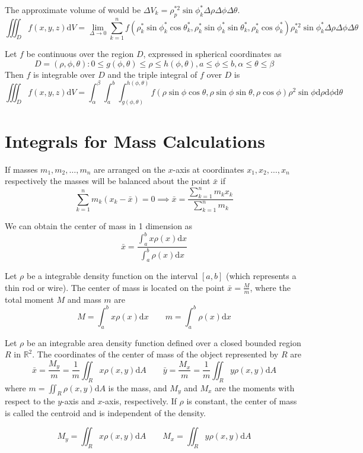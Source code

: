 \documentclass[../calc3.tex]{subfiles}
\begin{document}
The approximate volume of would be $\Delta V_k=\rho_p^{*2}\sin\phi_k^* \Delta\rho\Delta\phi\Delta\theta$.
\[\iiint_D f(x,y,z)\mathrm{d}V = \lim_{\Delta\to 0}\sum^n_{k=1}f(\rho_k^*\sin\phi_k^*\cos\theta_k^*,\rho_k^*\sin\phi_k^*\sin\theta_k^*,\rho_k^*\cos\phi_k^*)\rho_k^{*2}\sin\phi_k^*\Delta\rho\Delta\phi\Delta\theta\]

\begin{theorem}
    Let $f$ be continuous over the region $D$, expressed in spherical coordinates as 
    \[D={(\rho,\phi,\theta):0\leq g(\phi,\theta)\leq \rho\leq h(\phi,\theta),a\leq\phi\leq b,\alpha\leq \theta\leq \beta}\]
    Then $f$ is integrable over $D$ and the triple integral of $f$ over $D$ is
    \[\iiint_D f(x,y,z)\mathrm{d}V = \int_{\alpha}^{\beta}\int_a^b\int_{g(\phi,\theta)}^{h(\phi,\theta)}f(\rho\sin\phi\cos\theta,\rho\sin\phi\sin\theta,\rho\cos\phi)\rho^2\sin\phi\mathrm{d}\rho\mathrm{d}\phi\mathrm{d}\theta\]
\end{theorem}

\section{Integrals for Mass Calculations}
If masses $m_1,m_2,\dots,m_n$ are arranged on the $x$-axis at coordinates $x_1,x_2,\dots,x_n$
respectively the masses will be balanced about the point $\bar{x}$ if 
\[\sum_{k=1}^n m_k(x_k-\bar{x})=0\implies \bar{x}=\frac{\sum^n_{k=1}m_k x_k}{\sum^n_{k=1}m_k}\]

We can obtain the center of mass in 1 dimension as 
\[\bar{x}=\frac{\int_a^b x\rho(x)\mathrm{d}x}{\int_a^b\rho(x)\mathrm{d}x}\]
\pagebreak
\begin{definition}
    Let $\rho$ be a integrable density function on the interval $[a,b]$ (which represents a thin rod or wire). 
    The center of mass is located on the point $\bar{x}=\frac{M}{m}$, where the total moment $M$ and mass $m$ are 
    \[M=\int_a^b x\rho(x)\mathrm{d}x\qquad m = \int_a^b \rho(x)\mathrm{d}x\]
\end{definition}

\begin{definition}
    Let $\rho$ be an integrable area density function defined over a closed bounded region $R$ in 
    $\mathbb{R}^2$. The coordinates of the center of mass of the object represented by $R$ are 
    \[\bar{x}=\frac{M_y}{m}=\frac{1}{m}\iint_R x\rho(x,y)\mathrm{d}A \qquad \bar{y}=\frac{M_x}{m}=\frac{1}{m}\iint_R y\rho(x,y)\mathrm{d}A\]
    where $m = \iint_R \rho(x,y)\mathrm{d}A$ is the mass, and $M_y$ and $M_x$ are the moments with respect to the $y$-axis and $x$-axis, 
    respectively. If $\rho$ is constant, the center of mass is called the centroid and is independent of the density.
\end{definition}
\[M_y = \iint_R x\rho(x,y)\mathrm{d}A \qquad M_x = \iint_R y\rho(x,y)\mathrm{d}A\]
\end{document}
